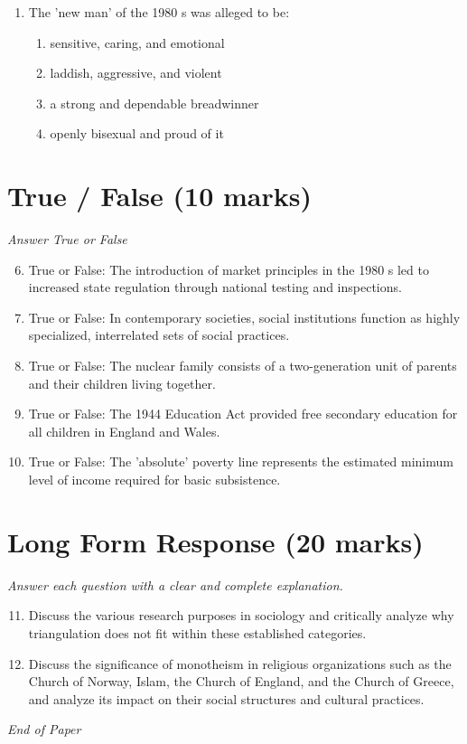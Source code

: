 \documentclass[12pt]{article}
\begin{document}
\begin{enumerate}[label=\arabic*.]
\begin{enumerate}[label=(\alph*)]
    \item Marquesses of England, Earls of Great Britain, King's Brothers
    \item Esquires, Serjeants of Law, Dukes' Eldest Sons
    \item King's Grandsons, Lord High Treasurer, Companions of the Bath
\end{enumerate}
\item The 'new man' of the 1980 s was alleged to be:
\begin{enumerate}[label=(\alph*)]
    \item sensitive, caring, and emotional
    \item laddish, aggressive, and violent
    \item a strong and dependable breadwinner
    \item openly bisexual and proud of it
\end{enumerate}
\end{enumerate}

\section*{True / False (10 marks)}
\textit{Answer True or False}
\begin{enumerate}[label=\arabic*.]
\setcounter{enumi}{5}
\item True or False: The introduction of market principles in the 1980 s led to increased state regulation through national testing and inspections.
\item True or False: In contemporary societies, social institutions function as highly specialized, interrelated sets of social practices.
\item True or False: The nuclear family consists of a two-generation unit of parents and their children living together.
\item True or False: The 1944 Education Act provided free secondary education for all children in England and Wales.
\item True or False: The 'absolute' poverty line represents the estimated minimum level of income required for basic subsistence.
\end{enumerate}

\section*{Long Form Response (20 marks)}
\textit{Answer each question with a clear and complete explanation.}
\begin{enumerate}[label=\arabic*.]
\setcounter{enumi}{10}
\item Discuss the various research purposes in sociology and critically analyze why triangulation does not fit within these established categories.
\item Discuss the significance of monotheism in religious organizations such as the Church of Norway, Islam, the Church of England, and the Church of Greece, and analyze its impact on their social structures and cultural practices.
\end{enumerate}

\vfill
\noindent\textit{End of Paper}
\end{document}
